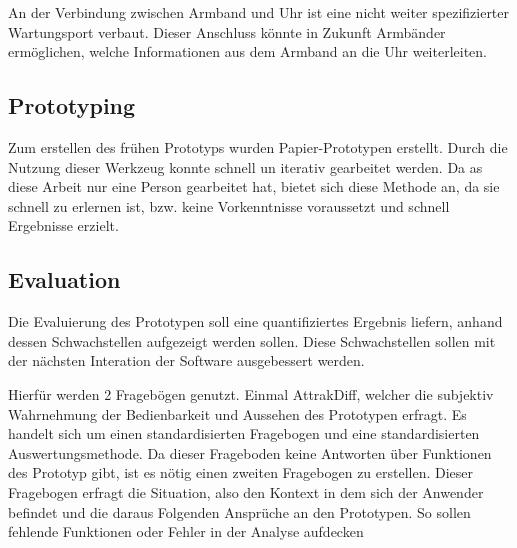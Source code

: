 An der Verbindung zwischen Armband und Uhr ist eine nicht weiter spezifizierter Wartungsport verbaut. Dieser Anschluss könnte in Zukunft Armbänder ermöglichen, welche Informationen aus dem Armband an die Uhr weiterleiten.
\subsection{Prototyping}
Zum erstellen des frühen Prototyps wurden Papier-Prototypen erstellt. Durch die Nutzung dieser Werkzeug konnte schnell un iterativ gearbeitet werden. Da as diese Arbeit nur eine Person gearbeitet hat, bietet sich diese Methode an, da sie schnell zu erlernen ist, bzw. keine Vorkenntnisse voraussetzt und schnell Ergebnisse erzielt.
\subsection{Evaluation}
Die Evaluierung des Prototypen soll eine quantifiziertes Ergebnis liefern, anhand dessen Schwachstellen aufgezeigt werden sollen. Diese Schwachstellen sollen mit der nächsten Interation der Software ausgebessert werden.

Hierfür werden 2 Fragebögen genutzt. Einmal AttrakDiff, welcher die subjektiv  Wahrnehmung der Bedienbarkeit und Aussehen des Prototypen erfragt. Es handelt sich um einen standardisierten Fragebogen und eine standardisierten Auswertungsmethode. Da dieser Frageboden keine Antworten über Funktionen des Prototyp gibt, ist es nötig einen zweiten Fragebogen zu erstellen. Dieser Fragebogen erfragt die Situation, also den Kontext in dem sich der Anwender befindet und die daraus Folgenden Ansprüche an den Prototypen. So sollen fehlende Funktionen oder Fehler in der Analyse aufdecken

